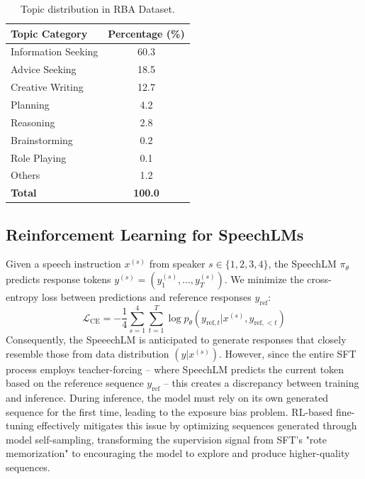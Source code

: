 \documentclass[letterpaper]{article} %
\begin{document}
\begin{table}[t]
\centering
\caption{Topic distribution in RBA Dataset.}
\label{tab:task_distribution}
\begin{tabular}{l| c }
\toprule
\textbf{Topic Category} & \textbf{Percentage (\%)} \\
\midrule
Information Seeking & 60.3  \\
Advice Seeking & 18.5 \\
Creative Writing & 12.7  \\
Planning & 4.2  \\
Reasoning  & 2.8 \\
Brainstorming & 0.2\\
Role Playing & 0.1 \\
Others & 1.2 \\
\midrule
\textbf{Total} & \textbf{100.0} \\
\bottomrule
\end{tabular}
\label{t1}
\end{table}


\subsection{Reinforcement Learning for SpeechLMs}
Given a speech instruction $x^{(s)}$ from speaker $s \in \{1,2,3,4\}$, the SpeechLM $\pi_{\theta}$ predicts response tokens $y^{(s)} = (y_1^{(s)},...,y_T^{(s)})$. We minimize the cross-entropy loss between predictions and reference responses $y_\mathrm{ref}$:
\begin{equation}
    \mathcal{L}_\mathrm{CE} = -\frac{1}{4}\sum_{s=1}^4 \sum_{t=1}^T \log p_\theta(y_{\mathrm{ref},t} | x^{(s)}, y_{\mathrm{ref},<t})
\end{equation}
Consequently, the SpeeechLM is anticipated to generate responses that closely resemble those from data distribution $(y|x^{(s)})$. However, since the entire SFT process employs teacher-forcing – where SpeechLM predicts the current token based on the reference sequence $y_\mathrm{ref}$ – this creates a discrepancy between training and inference. During inference, the model must rely on its own generated sequence for the first time, leading to the exposure bias problem. RL-based fine-tuning effectively mitigates this issue by optimizing sequences generated through model self-sampling, transforming the supervision signal from SFT's "rote memorization" to encouraging the model to explore and produce higher-quality sequences. \par
\end{document}
